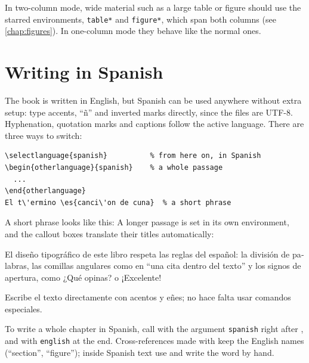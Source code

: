 \begin{note}
In two-column mode, wide material such as a large table or figure should use
the starred environments, \texttt{table*} and \texttt{figure*}, which span both
columns (see \cref{chap:figures}). In one-column mode they behave like the
normal ones.
\end{note}

\section{Writing in Spanish}\label{sec:spanish}

The book is written in English, but Spanish can be used anywhere without extra
setup: type accents, \enquote{\~n} and inverted marks directly, since the
files are UTF-8. Hyphenation, quotation marks and captions follow the active
language. There are three ways to switch:

\begin{lstlisting}[language={[LaTeX]TeX}]
\selectlanguage{spanish}          % from here on, in Spanish
\begin{otherlanguage}{spanish}    % a whole passage
  ...
\end{otherlanguage}
El t\'ermino \es{canci\'on de cuna}  % a short phrase
\end{lstlisting}

A short phrase looks like this:  A longer passage is set in its own environment, and the callout
boxes translate their titles automatically:

\begin{otherlanguage}{spanish}
El diseño tipográfico de este libro respeta las reglas del español: la
división de palabras, las comillas angulares como en
\enquote{una cita dentro del texto} y los signos de apertura, como
¿Qué opinas? o ¡Excelente!

\begin{tip}
Escribe el texto directamente con acentos y eñes; no hace falta usar
comandos especiales.
\end{tip}
\end{otherlanguage}

To write a whole chapter in Spanish, call  with the
argument \texttt{spanish} right after , and with \texttt{english}
at the end. Cross-references made with  keep the English names
(\enquote{section}, \enquote{figure}); inside Spanish text use  and
write the word by hand.
